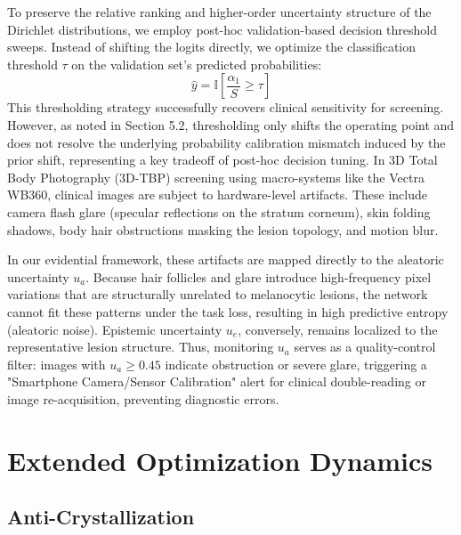 \documentclass[letterpaper]{article} %
\begin{document}
To preserve the relative ranking and higher-order uncertainty structure of the Dirichlet distributions, we employ post-hoc validation-based decision threshold sweeps. Instead of shifting the logits directly, we optimize the classification threshold $\tau$ on the validation set's predicted probabilities:
\begin{equation}
    \hat{y} = \mathbb{I}\!\left[ \frac{\alpha_1}{S} \ge \tau \right]
\end{equation}
This thresholding strategy successfully recovers clinical sensitivity for screening. However, as noted in Section 5.2, thresholding only shifts the operating point and does not resolve the underlying probability calibration mismatch induced by the prior shift, representing a key tradeoff of post-hoc decision tuning.
In 3D Total Body Photography (3D-TBP) screening using macro-systems like the Vectra WB360, clinical images are subject to hardware-level artifacts. These include camera flash glare (specular reflections on the stratum corneum), skin folding shadows, body hair obstructions masking the lesion topology, and motion blur. 

In our evidential framework, these artifacts are mapped directly to the aleatoric uncertainty $u_a$. Because hair follicles and glare introduce high-frequency pixel variations that are structurally unrelated to melanocytic lesions, the network cannot fit these patterns under the task loss, resulting in high predictive entropy (aleatoric noise). Epistemic uncertainty $u_e$, conversely, remains localized to the representative lesion structure. Thus, monitoring $u_a$ serves as a quality-control filter: images with $u_a \ge 0.45$ indicate obstruction or severe glare, triggering a "Smartphone Camera/Sensor Calibration" alert for clinical double-reading or image re-acquisition, preventing diagnostic errors.

\section{Extended Optimization Dynamics}
\subsection{Anti-Crystallization}\label{subsec:anti_crystal}
\end{document}
